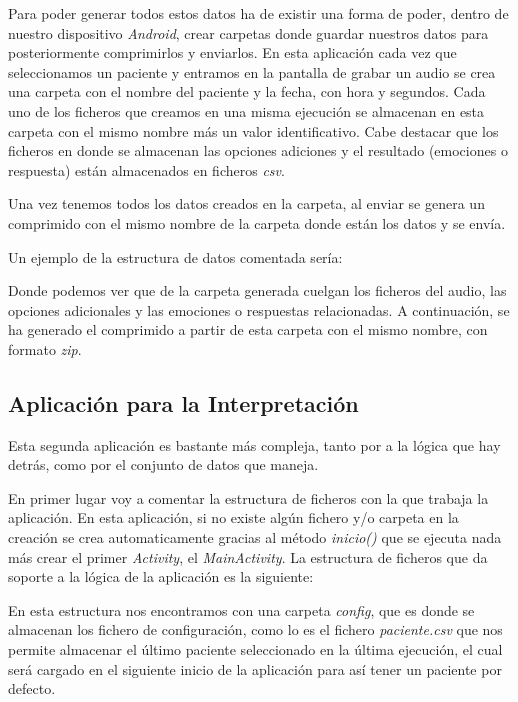 Para poder generar todos estos datos ha de existir una forma de poder, dentro de nuestro dispositivo \textit{Android}, crear carpetas donde guardar nuestros datos para posteriormente comprimirlos y enviarlos. En esta aplicación cada vez que seleccionamos un paciente y entramos en la pantalla de grabar un audio se crea una carpeta con el nombre del paciente y la fecha, con hora y segundos. Cada uno de los ficheros que creamos en una misma ejecución se almacenan en esta carpeta con el mismo nombre más un valor identificativo. Cabe destacar que los ficheros en donde se almacenan las opciones adiciones y el resultado (emociones o respuesta) están almacenados en ficheros \textit{csv}.

Una vez tenemos todos los datos creados en la carpeta, al enviar se genera un comprimido con el mismo nombre de la carpeta donde están los datos y se envía.

Un ejemplo de la estructura de datos comentada sería:


Donde podemos ver que de la carpeta generada cuelgan los ficheros del audio, las opciones adicionales y las emociones o respuestas relacionadas. A continuación,  se ha generado el comprimido a partir de esta carpeta con el mismo nombre, con formato \textit{zip}.
\subsection{Aplicación para la Interpretación}
Esta segunda aplicación es bastante más compleja, tanto por a la lógica que hay detrás, como por el conjunto de datos que maneja.

En primer lugar voy a comentar la estructura de ficheros con la que trabaja la aplicación. En esta aplicación, si no existe algún fichero y/o carpeta en la creación se crea automaticamente gracias al método \textit{inicio()} que se ejecuta nada más crear el primer \textit{Activity}, el \textit{MainActivity}. La estructura de ficheros que da soporte a la lógica de la aplicación es la siguiente:


En esta estructura nos encontramos con una carpeta \textit{config}, que es donde se almacenan los fichero de configuración, como lo es el fichero \textit{paciente.csv} que nos permite almacenar el último paciente seleccionado en la última ejecución, el cual será cargado en el siguiente inicio de la aplicación para así tener un paciente por defecto.

